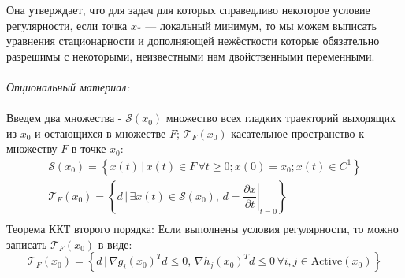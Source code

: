 Она утверждает, что для задач для которых справедливо некоторое условие регулярности, если точка $x_{*}$ — локальный минимум, то мы можем выписать уравнения стационарности и дополняющей нежёсткости которые обязательно разрешимы с некоторыми, неизвестными нам двойственными переменными. \\ \\
\textit{Опциональный материал:} \\ \\
Введем два множества - $\mathcal{S}(x_{0})$ множество всех гладких траекторий выходящих из $x_{0}$ и остающихся в множестве $F$; $\mathcal{T}_{F}(x_{0})$ касательное пространство к множеству $F$ в точке $x_{0}$:
\begin{gather*}
    \mathcal{S}(x_{0}) = \left\{ x(t) \,|\, x(t) \in F \, \forall t \geq 0; x(0) = x_{0}; x(t) \in C^{1} \right\}\\
    \mathcal{T}_{F}(x_{0}) = \left\{ d \,|\, \exists x(t) \in \mathcal{S}(x_{0}),\, \left. d = \dfrac{\partial x}{\partial t}\right|_{t = 0} \right\}\\
\end{gather*}
Теорема ККТ второго порядка:
Если выполнены условия регулярности, то можно записать $\mathcal{T}_{F}(x_{0})$ в виде:
\[
    \mathcal{T}_{F}(x_{0}) = \left\{ d \,|\, \nabla g_{i}(x_{0})^T d \leq 0, \, \nabla h_{j}(x_{0})^T d \leq 0 \, \forall i, j \in \text{Active}(x_{0}) \right\}
\]
